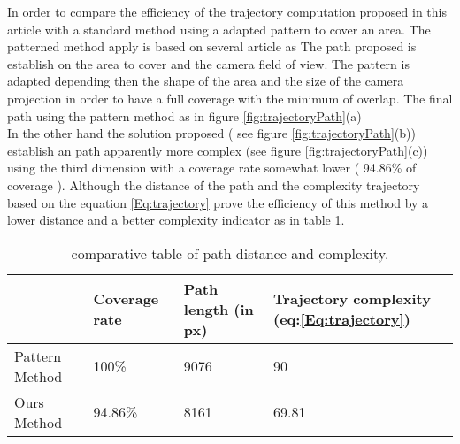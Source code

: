   In order to compare the efficiency of the trajectory computation proposed in this article with a standard method using a adapted pattern to cover an area. The patterned method apply is based on several article as \cite{63*,66*,pattern155*}
 The path proposed is establish on the area to cover and the camera field of view. The pattern is adapted depending then the shape of the area and the size of the camera projection in order to have a full coverage with the minimum of overlap. The final path using the pattern method as in figure \ref{fig:trajectoryPath}(a)
 \\In the other hand the solution proposed ( see figure \ref{fig:trajectoryPath}(b)) establish an path apparently more complex (see figure \ref{fig:trajectoryPath}(c)) using the third dimension with a coverage rate somewhat lower ( 94.86\% of coverage ).
 Although  the distance of the path  and the complexity trajectory based on  the equation \ref{Eq:trajectory} prove the efficiency of this method by a lower distance and a better complexity indicator as in table \ref{table:trajectory}.\\ 
 \begin{table}[t]
\begin{tabular}{|p{1.5cm}|p{1.8cm}|p{1.8cm}|p{1.8cm}|}
  \hline
   &Coverage rate & Path length (in px) &Trajectory complexity (eq:\ref{Eq:trajectory})  \\  \hline
  Pattern Method &  100\% & 9076 &90 \\ \hline
  Ours Method &  94.86\% & 8161 &69.81 \\ \hline
\end{tabular}
\caption{comparative table  of path distance and complexity.}\label{table:trajectory}
\end{table}
 
